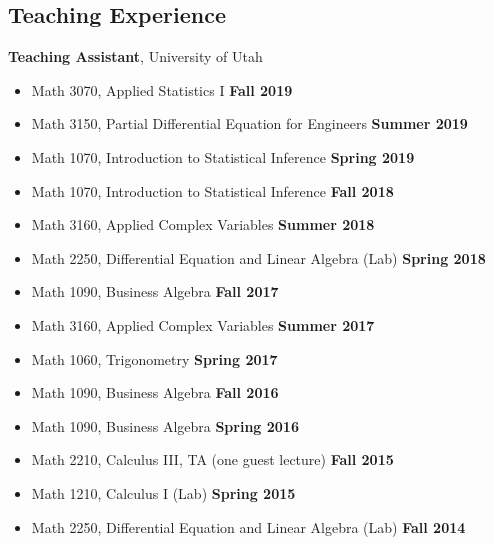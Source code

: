 \documentclass[margin,line]{res}
\begin{document}
\begin{resume}
\section{\sc Teaching Experience}
{\bf Teaching Assistant}, University of Utah
\vspace*{.05in}
\begin{itemize}
\item[ ] Math 3070, Applied Statistics I \hfill {\bf Fall 2019}
\item[ ] Math 3150, Partial Differential Equation for Engineers \hfill {\bf Summer 2019}
\item[ ] Math 1070, Introduction to Statistical Inference \hfill {\bf Spring 2019}
\item[ ] Math 1070, Introduction to Statistical Inference \hfill {\bf Fall 2018}
\item[ ] Math 3160, Applied Complex Variables \hfill {\bf Summer 2018}
\item[ ] Math 2250, Differential Equation and Linear Algebra (Lab) \hfill {\bf Spring 2018}
\item[ ] Math 1090, Business Algebra \hfill {\bf Fall 2017}
\item[ ] Math 3160, Applied Complex Variables \hfill {\bf Summer 2017}
\item[ ] Math 1060, Trigonometry \hfill {\bf Spring 2017}
\item[ ] Math 1090, Business Algebra \hfill {\bf Fall 2016}
\item[ ] Math 1090, Business Algebra \hfill {\bf Spring 2016}
\item[ ] Math 2210, Calculus III, TA (one guest lecture) \hfill {\bf Fall 2015}
\item[ ] Math 1210, Calculus I (Lab) \hfill {\bf Spring 2015}
\item[ ] Math 2250, Differential Equation and Linear Algebra (Lab) \hfill {\bf Fall 2014}
\end{itemize}

\end{resume}
\end{document}
